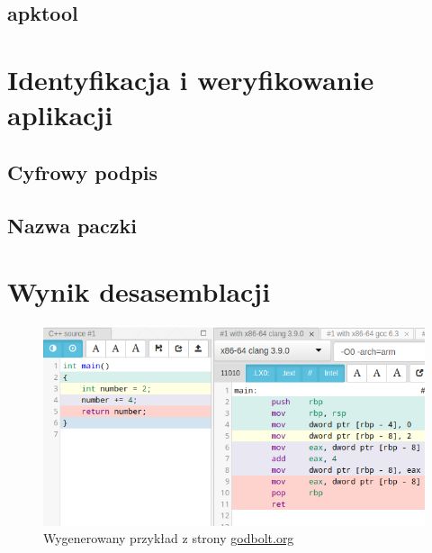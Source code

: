 \documentclass[12pt,a4paper,leqno,oneside,titlepage]{book}
\begin{document}
\section{apktool}


\chapter{Identyfikacja i weryfikowanie aplikacji}
\section{Cyfrowy podpis}
\section{Nazwa paczki}


\chapter{Wynik desasemblacji}

\begin{figure}[h!]
	\centering
	\includegraphics[height=0.3\textheight]{img/Screenshot_godbolt_org-sample.png}
	\caption{Wygenerowany przykład z strony \url{godbolt.org}}
\end{figure}
\end{document}
